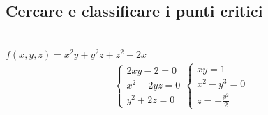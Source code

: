 \documentclass[a4paper, oneside]{article}
\begin{document}
        \subsection{Cercare e classificare i punti critici}
        \begin{example}
            \hfil\\


%
%
            $f(x,y,z) = x^2y+y^2z+z^2-2x$
            \begin{gather*}
                \begin{cases}
                    2xy-2=0\\
                    x^2 +2yz = 0\\
                    y^2+2z = 0
                \end{cases}
                \begin{cases}
                    xy = 1\\
                    x^2 -y^3 = 0\\
                    z = -\frac{y^2}{2}
                \end{cases}

\end{gather*}
\end{example}
\end{document}
